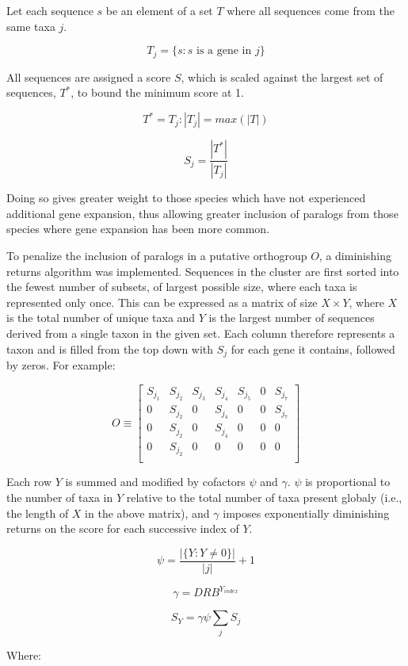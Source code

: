 \documentclass[twocolumn]{bmcart}%
\begin{document}
Let each sequence $s$ be an element of a set $T$ where all sequences come from the same taxa $j$.

$$
T_j = \{s:s \text{ is a gene in } j\}
$$

All sequences are assigned a score $S$, which is scaled against the largest set of sequences, $T^*$, to bound the minimum score at 1.

$$
T^* = T_j:|T_j| = max(|T|)
$$

$$
S_j = \frac{|T^*|}{|T_j|}
$$

Doing so gives greater weight to those species which have not experienced additional gene expansion, thus allowing greater inclusion of paralogs from those species where gene expansion has been more common.

To penalize the inclusion of paralogs in a putative orthogroup $O$, a diminishing returns algorithm was implemented. Sequences in the cluster are first sorted into the fewest number of subsets, of largest possible size, where each taxa is represented only once. This can be expressed as a matrix of size $X \times Y$, where $X$ is the total number of unique taxa and $Y$ is the largest number of sequences derived from a single taxon in the given set. Each column therefore represents a taxon and is filled from the top down with $S_j$ for each gene it contains, followed by zeros. For example:


$$
O \equiv
\begin{bmatrix}
    S_{j_1} & S_{j_2} & S_{j_3} & S_{j_4} & S_{j_5} & 0 & S_{j_7}\\
    0 & S_{j_2} & 0 & S_{j_4} & 0 & 0 & S_{j_7} \\
    0 & S_{j_2} & 0 & S_{j_4} & 0 & 0 & 0 \\
    0 & S_{j_2} & 0 & 0 & 0 & 0 & 0 \\
\end{bmatrix}
$$

Each row $Y$ is summed and modified by cofactors $\psi$ and $\gamma$. $\psi$ is proportional to the number of taxa in $Y$ relative to the total number of taxa present globaly (i.e., the length of $X$ in the above matrix), and $\gamma$ imposes exponentially diminishing returns on the score for each successive index of $Y$.

$$
\psi = \frac{|\{Y:Y \neq 0\}|}{|j|} + 1
$$

$$
\gamma = DRB^{Y_{index}}
$$

$$
S_Y = \gamma\psi\sum_{j} S_j
$$

Where:
\end{document}
